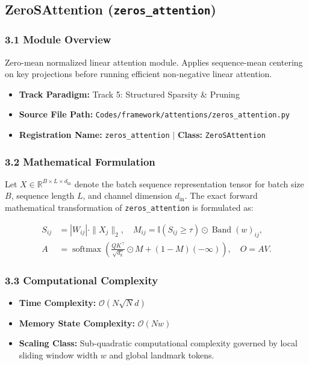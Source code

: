 \subsection{ZeroSAttention (\texttt{zeros\_attention})}
\label{sec:app_module_zeros_attention}

\subsubsection*{3.1 Module Overview}
Zero-mean normalized linear attention module.  Applies sequence-mean centering on key projections before running efficient non-negative linear attention.
\begin{itemize}
    \item \textbf{Track Paradigm:} Track 5: Structured Sparsity \& Pruning
    \item \textbf{Source File Path:} \texttt{Codes/framework/attentions/zeros\_attention.py}
    \item \textbf{Registration Name:} \texttt{zeros\_attention} $\mid$ \textbf{Class:} \texttt{ZeroSAttention}
\end{itemize}

\subsubsection*{3.2 Mathematical Formulation}
Let $X \in \mathbb{R}^{B \times L \times d_{\text{in}}}$ denote the batch sequence representation tensor for batch size $B$, sequence length $L$, and channel dimension $d_{\text{in}}$. The exact forward mathematical transformation of \texttt{zeros\_attention} is formulated as:

\begin{align}
S_{ij} &= |W_{ij}| \cdot \|X_j\|_2, \quad M_{ij} = \mathbb{I}(S_{ij} \ge \tau) \odot \operatorname{Band}(w)_{ij}, \\
A &= \operatorname{softmax}\left(\frac{Q K^\top}{\sqrt{d_k}} \odot M + (1 - M)(-\infty)\right), \quad O = A V.
\end{align}


\subsubsection*{3.3 Computational Complexity}
\begin{itemize}
    \item \textbf{Time Complexity:} $\mathcal{O}(N \sqrt{N} d)$
    \item \textbf{Memory State Complexity:} $\mathcal{O}(N w)$
    \item \textbf{Scaling Class:} Sub-quadratic computational complexity governed by local sliding window width $w$ and global landmark tokens.
\end{itemize}

